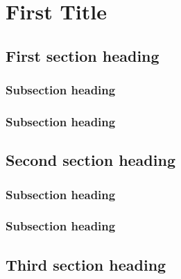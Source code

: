 \chapter[\DTMusedate{entry}]{First Title}

\section{First section heading}

\marginnote{\lipsum[1 - 4][2-4]}

\lipsum[1]

\subsection{Subsection heading}
\lipsum[1-2]

\marginnote{\lipsum[1][2-4]}

\lipsum[1-2]


\subsection{Subsection heading}
\lipsum[1-2]

\section{Second section heading}
\lipsum[2]

\marginnote{\lipsum[1 - 4][2-4]}

\lipsum[2]


\subsection{Subsection heading}
\lipsum[1-2]

\subsection{Subsection heading}
\lipsum[1-2]

\section{Third section heading}

\marginnote{\lipsum[1][2-4]}

\lipsum[1]